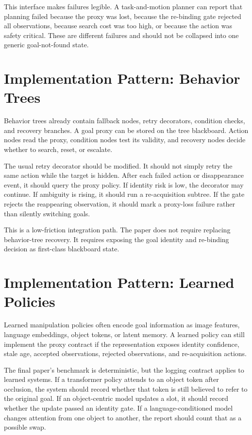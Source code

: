 This interface makes failures legible. A task-and-motion planner can report that planning failed because the proxy was lost, because the re-binding gate rejected all observations, because search cost was too high, or because the action was safety critical. These are different failures and should not be collapsed into one generic goal-not-found state.

\section{Implementation Pattern: Behavior Trees}

Behavior trees already contain fallback nodes, retry decorators, condition checks, and recovery branches. A goal proxy can be stored on the tree blackboard. Action nodes read the proxy, condition nodes test its validity, and recovery nodes decide whether to search, reset, or escalate.

The usual retry decorator should be modified. It should not simply retry the same action while the target is hidden. After each failed action or disappearance event, it should query the proxy policy. If identity risk is low, the decorator may continue. If ambiguity is rising, it should run a re-acquisition subtree. If the gate rejects the reappearing observation, it should mark a proxy-loss failure rather than silently switching goals.

This is a low-friction integration path. The paper does not require replacing behavior-tree recovery. It requires exposing the goal identity and re-binding decision as first-class blackboard state.

\section{Implementation Pattern: Learned Policies}

Learned manipulation policies often encode goal information as image features, language embeddings, object tokens, or latent memory. A learned policy can still implement the proxy contract if the representation exposes identity confidence, stale age, accepted observations, rejected observations, and re-acquisition actions.

The final paper's benchmark is deterministic, but the logging contract applies to learned systems. If a transformer policy attends to an object token after occlusion, the system should record whether that token is still believed to refer to the original goal. If an object-centric model updates a slot, it should record whether the update passed an identity gate. If a language-conditioned model changes attention from one object to another, the report should count that as a possible swap.

